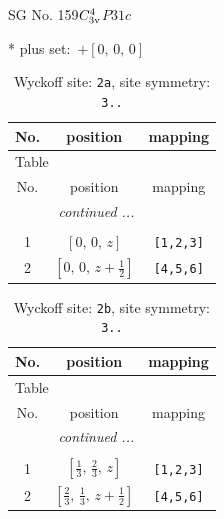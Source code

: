 \documentclass[fleqn,8pt]{jsarticle}
\begin{document}
\setcounter{MaxMatrixCols}{32}

\renewcommand{\tablename}{Table~}
\renewcommand{\figurename}{Figure~}
\begin{center}
\LARGE
SG No. 159\quad$C_{\rm 3v}^{4}$\quad$P31c$\quad[ trigonal ]
\end{center}
* plus set:\,\,\,$+\left[ 0,\, 0,\, 0 \right]$
\renewcommand{\arraystretch}{1.2}
\begin{longtable}{ccc}
\caption{Wyckoff site: {\tt 2a}, site symmetry: {\tt 3..}}
 \\
 \hline \hline
No. & position & mapping \\ \hline \endfirsthead

\multicolumn{2}{l}{\tablename\ \thetable{}} \\
 \hline \hline
No. & position & mapping \\ \hline \endhead

 \hline \hline
\multicolumn{2}{r}{\footnotesize\it continued ...} \\ \endfoot

 \hline \hline
\multicolumn{2}{r}{} \\ \endlastfoot

1 & $\left[ 0,\, 0,\, z \right]$ & {\tt [1,2,3]} \\ \hline
2 & $\left[ 0,\, 0,\, z + \frac{1}{2} \right]$ & {\tt [4,5,6]} \\
\end{longtable}
\renewcommand{\arraystretch}{1.2}
\begin{longtable}{ccc}
\caption{Wyckoff site: {\tt 2b}, site symmetry: {\tt 3..}}
 \\
 \hline \hline
No. & position & mapping \\ \hline \endfirsthead

\multicolumn{2}{l}{\tablename\ \thetable{}} \\
 \hline \hline
No. & position & mapping \\ \hline \endhead

 \hline \hline
\multicolumn{2}{r}{\footnotesize\it continued ...} \\ \endfoot

 \hline \hline
\multicolumn{2}{r}{} \\ \endlastfoot

1 & $\left[ \frac{1}{3},\, \frac{2}{3},\, z \right]$ & {\tt [1,2,3]} \\ \hline
2 & $\left[ \frac{2}{3},\, \frac{1}{3},\, z + \frac{1}{2} \right]$ & {\tt [4,5,6]} \\
\end{longtable}
\end{document}
